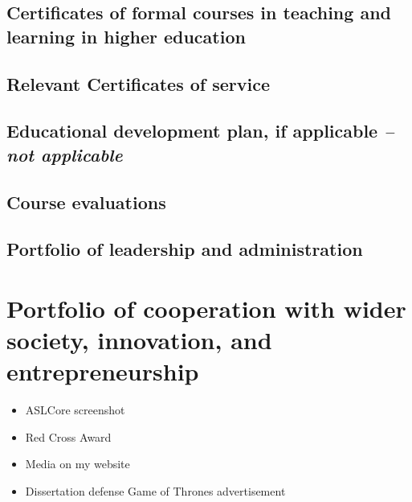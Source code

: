 \begin{figure}[h!]
	\hspace{1em}
\end{figure}

\section{Certificates of formal courses in teaching and learning in higher education \noneyet} \label{sec:certificates-of-formal-courses-in-teaching-and-learning-in-higher-education-noneyet}
\section{Relevant Certificates of service \noneyet} \label{sec:relevant-certificates-of-service-noneyet}
\section{Educational development plan, if applicable \normalsize{\textit{-- not applicable}}} \label{sec:educational-development-plan-if-applicable-not-applicable}
\section{Course evaluations} \label{sec:course-evaluations}

\section{Portfolio of leadership and administration} \label{sec:portfolio-of-leadership-and-administration}

\setcounter{chapter}{6}
\chapter{Portfolio of cooperation with wider society, innovation, and entrepreneurship}
\begin{itemize}
	\item ASLCore screenshot
	\item Red Cross Award
	\item Media on my website
	\item Dissertation defense Game of Thrones advertisement
\end{itemize}


